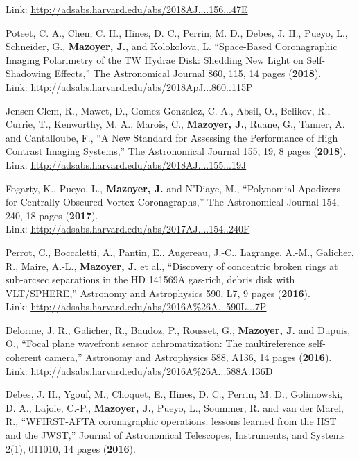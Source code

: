 \documentclass[11pt,a4paper, french]{article}
\begin{document}
\begin{etaremune}
Link: \textcolor{BrickRed}{\underline{\url{http://adsabs.harvard.edu/abs/2018AJ....156...47E}}}
\item Poteet, C. A., Chen, C. H., Hines, D. C., Perrin, M. D., Debes, J. H., Pueyo, L., Schneider, G., \textbf{Mazoyer, J.}, and Kolokolova, L. “Space-Based Coronagraphic Imaging Polarimetry of the TW Hydrae Disk: Shedding New Light on Self-Shadowing Effects,” The Astronomical Journal 860, 115, 14 pages (\textbf{2018}).\\
Link: \textcolor{BrickRed}{\underline{\url{http://adsabs.harvard.edu/abs/2018ApJ...860..115P}}}
\item Jensen-Clem, R., Mawet, D., Gomez Gonzalez, C. A., Absil, O., Belikov, R., Currie, T., Kenworthy, M. A., Marois, C., \textbf{Mazoyer, J.}, Ruane, G., Tanner, A. and Cantalloube, F., “A New Standard for Assessing the Performance of High Contrast Imaging Systems,” The Astronomical Journal 155, 19, 8 pages (\textbf{2018}).\\
Link: \textcolor{BrickRed}{\underline{\url{http://adsabs.harvard.edu/abs/2018AJ....155...19J}}}
\item Fogarty, K., Pueyo, L., \textbf{Mazoyer, J.} and N’Diaye, M., “Polynomial Apodizers for Centrally Obscured Vortex Coronagraphs,” The Astronomical Journal 154, 240, 18 pages (\textbf{2017}).\\
Link: \textcolor{BrickRed}{\underline{\url{http://adsabs.harvard.edu/abs/2017AJ....154..240F}}}
\item Perrot, C., Boccaletti, A., Pantin, E., Augereau, J.-C., Lagrange, A.-M., Galicher, R., Maire, A.-L., \textbf{Mazoyer, J.} et al., “Discovery of concentric broken rings at sub-arcsec separations in the HD 141569A gas-rich, debris disk with VLT/SPHERE,” Astronomy and Astrophysics 590, L7, 9 pages (\textbf{2016}).\\
Link: \textcolor{BrickRed}{\underline{\url{http://adsabs.harvard.edu/abs/2016A\%26A...590L...7P}}}
\item Delorme, J. R., Galicher, R., Baudoz, P., Rousset, G., \textbf{Mazoyer, J.} and Dupuis, O., “Focal plane wavefront sensor achromatization: The multireference self-coherent camera,” Astronomy and Astrophysics 588, A136, 14 pages (\textbf{2016}).\\
Link: \textcolor{BrickRed}{\underline{\url{http://adsabs.harvard.edu/abs/2016A\%26A...588A.136D}}}
\item Debes, J. H., Ygouf, M., Choquet, E., Hines, D. C., Perrin, M. D., Golimowski, D. A., Lajoie, C.-P., \textbf{Mazoyer, J.}, Pueyo, L., Soummer, R. and van der Marel, R., “WFIRST-AFTA coronagraphic operations: lessons learned from the HST and the JWST,” Journal of Astronomical Telescopes, Instruments, and Systems 2(1), 011010, 14 pages (\textbf{2016}).\\

\end{etaremune}
\end{document}
